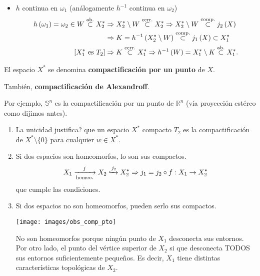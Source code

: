 \begin{demo}
\begin{enumerate}
\begin{itemize}
        \item $h$ continua en $\omega_1$ (análogamente $h^{-1}$ continua en $\omega_2$)
        \begin{align*}
            h\left( \omega_1 \right) = \omega_2 \in W \stackrel{\text{ab.}}{\subset} X_2^* &\Rightarrow X_2^* \setminus W \stackrel{\text{cerr.}}{\subset} X_2^* \Rightarrow X_2^* \setminus W \stackrel{\text{comp.}}{\subset} j_2\left( X \right)\\
            &\Rightarrow K = h^{-1}\left( X_2^* \setminus W \right) \stackrel{\text{comp.}}{\subset} j_1\left( X \right) \subset X_1^*\\
            \left[ X_1^* \text{ es } T_2 \right] &\Rightarrow K \stackrel{\text{cerr.}}{\subset} X_1^* \Rightarrow h^{-1}\left( W \right) = X_1^* \setminus K \stackrel{\text{ab.}}{\subset} X_1^*
        .\end{align*}
    \end{itemize}
\end{enumerate}
\end{demo}

\begin{defi}
El espacio $X^*$ se denomina \textbf{compactificación por un punto} de $X$. 

También, \textbf{compactificación de Alexandroff}.
\end{defi}
Por ejemplo, $\mathbb{S}^n$ es la compactificación por un punto de $\mathbb{R}^n$ (vía proyección estéreo como dijimos antes).

\begin{obs}[¡Importante!]
\begin{enumerate}
    \item La unicidad justifica? que un espacio $X^*$ compacto $T_2$ es la compactificación de $X^* \setminus \{0\}$ para cualquier $w \in X^*$.

    \item Si dos espacios son homeomorfos, lo son sus compactos.
    \[
        X_1 \xrightarrow[\text{homeo.}]{f} X_2 \xhookrightarrow{j_2} X_2^* \Rightarrow j_1 = j_2 \circ f : X_1 \rightarrow X_2^*
    \]
    que cumple las condiciones.

    \item Si dos espacios no son homeomorfos, pueden serlo sus compactos.
    \begin{center}
        \texttt{[image: images/obs\_comp\_pto]} 
    \end{center}
    No son homeomorfos porque %
    ningún punto de $X_1$ desconecta sus entornos. Por otro lado, el punto del vértice superior de $X_2$ si que desconecta TODOS sus entornos suficientemente pequeños. 
    Es decir, $X_1$ tiene distintas características topológicas de $X_2$.
\end{enumerate} 
\end{obs}

